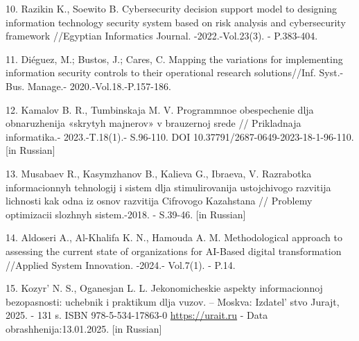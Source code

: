 \begin{references}
10. Razikin K., Soewito B. Cybersecurity decision support model to
designing information technology security system based on risk analysis
and cybersecurity framework //Egyptian Informatics Journal.
-2022.-Vol.23(3). - P.383-404.
\href{https://doi.org/10.1016/j.eij.2022.03.001}{}

11. Diéguez, M.; Bustos, J.; Cares, C. Mapping the variations for
implementing information security controls to their operational research
solutions//Inf. Syst.-Bus. Manage.- 2020.-Vol.18.-P.157-186.
~\href{https://doi.org/10.1007/s10257-020-00470-8}{}

12. Kamalov B. R., Tumbinskaja M. V. Programmnoe obespechenie dlja
obnaruzhenija «skrytyh majnerov» v brauzernoj srede // Prikladnaja
informatika.- 2023.-T.18(1).- S.96-110. DOI
10.37791/2687-0649-2023-18-1-96-110. {[}in Russian{]}

13. Musabaev R., Kasymzhanov B., Kalieva G., Ibraeva, V. Razrabotka
informacionnyh tehnologij i sistem dlja stimulirovanija ustojchivogo
razvitija lichnosti kak odna iz osnov razvitija Cifrovogo
Kazahstana // Problemy optimizacii slozhnyh sistem.-2018. - S.39-46.
{[}in Russian{]}

14. Aldoseri A., Al-Khalifa K. N., Hamouda A. M. Methodological approach
to assessing the current state of organizations for AI-Based digital
transformation //Applied System Innovation. -2024.- Vol.7(1). - P.14.
\href{https://doi.org/10.3390/asi7010014}{}

15. Kozyr'{} N. S., Oganesjan L. L. Jekonomicheskie
aspekty informacionnoj bezopasnosti: uchebnik i praktikum dlja vuzov. --
Moskva: Izdatel' stvo Jurajt, 2025. - 131 s. ISBN
978-5-534-17863-0 \href{https://urait.ru/bcode/568708}{https://urait.ru} - Data
obrashhenija:13.01.2025. {[}in Russian{]}
\end{references}

